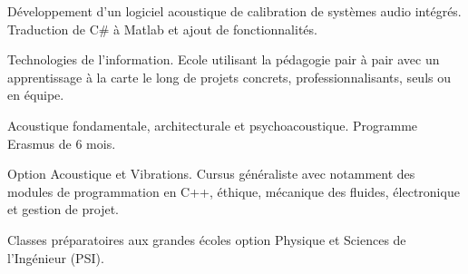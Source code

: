 \documentclass[10pt,a4paper]{altacv}
\begin{document}
D\'eveloppement d'un logiciel acoustique de calibration de syst\`emes audio int\'egr\'es. Traduction de C\# \`a
Matlab et ajout de fonctionnalit\'es.\linebreak

\clearpage


Technologies de l'information.\linebreak
Ecole utilisant la p\'edagogie pair \`a pair avec un apprentissage \`a la carte le long de projets concrets, professionnalisants, seuls ou en \'equipe.\linebreak
\divider

Acoustique fondamentale, architecturale et psychoacoustique.\linebreak
Programme Erasmus de 6 mois.\linebreak
\divider

Option Acoustique et Vibrations.\linebreak
Cursus g\'en\'eraliste avec notamment des modules de programmation en C++, \'ethique, m\'ecanique des fluides, \'electronique et gestion de projet.
\divider

Classes pr\'eparatoires aux grandes \'ecoles option Physique et Sciences de l'Ing\'enieur (PSI).

\clearpage
\end{document}
